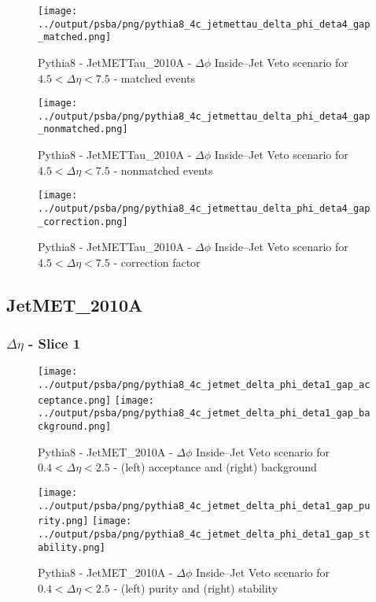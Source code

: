 \documentclass[11pt]{book}
\begin{document}
\begin{figure}[ht]
\centering
\texttt{[image: ../output/psba/png/pythia8\_4c\_jetmettau\_delta\_phi\_deta4\_gap\_matched.png]}
\caption{Pythia8 - JetMETTau\_2010A - $\Delta\phi$ Inside--Jet Veto scenario for $4.5 < \Delta\eta < 7.5$ - matched events}
\label{fig:p8_jetmettau_delta_phi_deta4_gap_matched}
\end{figure}

\begin{figure}[ht]
\centering
\texttt{[image: ../output/psba/png/pythia8\_4c\_jetmettau\_delta\_phi\_deta4\_gap\_nonmatched.png]}
\caption{Pythia8 - JetMETTau\_2010A - $\Delta\phi$ Inside--Jet Veto scenario for $4.5 < \Delta\eta < 7.5$ - nonmatched events}
\label{fig:p8_jetmettau_delta_phi_deta4_gap_nonmatched}
\end{figure}

\begin{figure}[ht]
\centering
\texttt{[image: ../output/psba/png/pythia8\_4c\_jetmettau\_delta\_phi\_deta4\_gap\_correction.png]}
\caption{Pythia8 - JetMETTau\_2010A - $\Delta\phi$ Inside--Jet Veto scenario for $4.5 < \Delta\eta < 7.5$ - correction factor}
\label{fig:p8_jetmettau_delta_phi_deta4_gap_correction}
\end{figure}



\clearpage
\subsection{JetMET\_2010A}
\subsubsection{$\Delta\eta$ - Slice 1}
\begin{figure}[ht]
\centering
\texttt{[image: ../output/psba/png/pythia8\_4c\_jetmet\_delta\_phi\_deta1\_gap\_acceptance.png]}
\texttt{[image: ../output/psba/png/pythia8\_4c\_jetmet\_delta\_phi\_deta1\_gap\_background.png]}
\caption{Pythia8 - JetMET\_2010A - $\Delta\phi$ Inside--Jet Veto scenario for $0.4 < \Delta\eta < 2.5$ - (left) acceptance and (right) background}
\label{fig:p8_jetmet_delta_phi_deta1_gap_ab}
\end{figure}

\begin{figure}[ht]
\centering
\texttt{[image: ../output/psba/png/pythia8\_4c\_jetmet\_delta\_phi\_deta1\_gap\_purity.png]}
\texttt{[image: ../output/psba/png/pythia8\_4c\_jetmet\_delta\_phi\_deta1\_gap\_stability.png]}
\caption{Pythia8 - JetMET\_2010A - $\Delta\phi$ Inside--Jet Veto scenario for $0.4 < \Delta\eta < 2.5$ - (left) purity and (right) stability}
\label{fig:p8_jetmet_delta_phi_deta1_gap_ps}
\end{figure}
\end{document}
